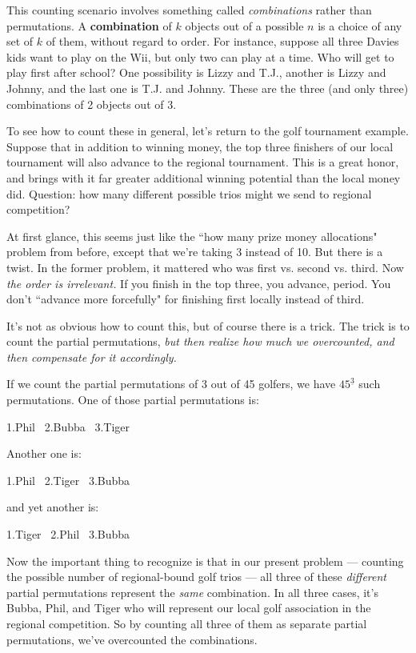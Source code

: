 This counting scenario involves something called \textit{combinations}
rather than permutations. A \textbf{combination} of $k$ objects out of a
possible $n$ is a choice of any set of $k$ of them, without regard to
order. For instance, suppose all three Davies kids want to play on the Wii,
but only two can play at a time. Who will get to play first after school?
One possibility is Lizzy and T.J., another is Lizzy and Johnny, and the
last one is T.J. and Johnny. These are the three (and only three)
combinations of 2 objects out of 3.

To see how to count these in general, let's return to the golf tournament
example. Suppose that in addition to winning money, the top three finishers
of our local tournament will also advance to the regional tournament. This
is a great honor, and brings with it far greater additional winning
potential than the local money did. Question: how many different possible
trios might we send to regional competition?

At first glance, this seems just like the ``how many prize money
allocations" problem from before, except that we're taking 3 instead of 10.
But there is a twist. In the former problem, it mattered who was first vs.
second vs. third. Now \textit{the order is irrelevant.} If you finish in
the top three, you advance, period. You don't ``advance more forcefully"
for finishing first locally instead of third.

It's not as obvious how to count this, but of course there is a trick. The
trick is to count the partial permutations, \textit{but then realize how
much we overcounted, and then compensate for it accordingly.}

If we count the partial permutations of 3 out of 45 golfers, we have
$45^{\underline{3}}$ such permutations. One of those partial permutations
is:
\begin{center}
1.Phil \ 2.Bubba \ 3.Tiger
\end{center}
Another one is:
\begin{center}
1.Phil \ 2.Tiger \ 3.Bubba
\end{center}
and yet another is:
\begin{center}
1.Tiger \ 2.Phil \ 3.Bubba
\end{center}
Now the important thing to recognize is that in our present problem ---
counting the possible number of regional-bound golf trios --- all
three of these \textit{different} partial permutations represent the
\textit{same} combination. In all three cases, it's Bubba, Phil, and Tiger
who will represent our local golf association in the regional competition.
So by counting all three of them as separate partial permutations, we've
overcounted the combinations.

